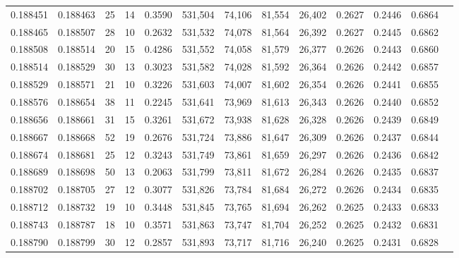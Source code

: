 \begin{tabular}{rrrrrrrrrrrrr}
0.188451 & 0.188463 &    25 &  14 &                                     0.3590 & 531,504 &  74,106 &  81,554 &  26,402 & 0.2627 & 0.2446 & 0.6864 \\
0.188465 & 0.188507 &    28 &  10 &                                     0.2632 & 531,532 &  74,078 &  81,564 &  26,392 & 0.2627 & 0.2445 & 0.6862 \\
0.188508 & 0.188514 &    20 &  15 &                                     0.4286 & 531,552 &  74,058 &  81,579 &  26,377 & 0.2626 & 0.2443 & 0.6860 \\
0.188514 & 0.188529 &    30 &  13 &                                     0.3023 & 531,582 &  74,028 &  81,592 &  26,364 & 0.2626 & 0.2442 & 0.6857 \\
0.188529 & 0.188571 &    21 &  10 &                                     0.3226 & 531,603 &  74,007 &  81,602 &  26,354 & 0.2626 & 0.2441 & 0.6855 \\
0.188576 & 0.188654 &    38 &  11 &                                     0.2245 & 531,641 &  73,969 &  81,613 &  26,343 & 0.2626 & 0.2440 & 0.6852 \\
0.188656 & 0.188661 &    31 &  15 &                                     0.3261 & 531,672 &  73,938 &  81,628 &  26,328 & 0.2626 & 0.2439 & 0.6849 \\
0.188667 & 0.188668 &    52 &  19 &                                     0.2676 & 531,724 &  73,886 &  81,647 &  26,309 & 0.2626 & 0.2437 & 0.6844 \\
0.188674 & 0.188681 &    25 &  12 &                                     0.3243 & 531,749 &  73,861 &  81,659 &  26,297 & 0.2626 & 0.2436 & 0.6842 \\
0.188689 & 0.188698 &    50 &  13 &                                     0.2063 & 531,799 &  73,811 &  81,672 &  26,284 & 0.2626 & 0.2435 & 0.6837 \\
0.188702 & 0.188705 &    27 &  12 &                                     0.3077 & 531,826 &  73,784 &  81,684 &  26,272 & 0.2626 & 0.2434 & 0.6835 \\
0.188712 & 0.188732 &    19 &  10 &                                     0.3448 & 531,845 &  73,765 &  81,694 &  26,262 & 0.2625 & 0.2433 & 0.6833 \\
0.188743 & 0.188787 &    18 &  10 &                                     0.3571 & 531,863 &  73,747 &  81,704 &  26,252 & 0.2625 & 0.2432 & 0.6831 \\
0.188790 & 0.188799 &    30 &  12 &                                     0.2857 & 531,893 &  73,717 &  81,716 &  26,240 & 0.2625 & 0.2431 & 0.6828 \\

\end{tabular}
